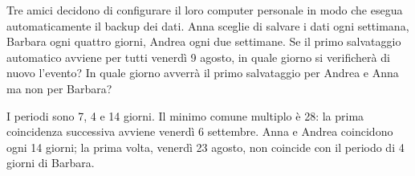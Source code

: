 
\begin{esercizio}
Tre amici decidono di configurare il loro computer personale in modo che esegua automaticamente il backup dei dati. Anna sceglie di salvare i dati ogni settimana, Barbara ogni quattro giorni, Andrea ogni due settimane. Se il primo salvataggio automatico avviene per tutti venerdì 9 agosto, in quale giorno si verificherà di nuovo l'evento? In quale giorno avverrà il primo salvataggio per Andrea e Anna ma non per Barbara?
\end{esercizio}

\begin{soluzione}
I periodi sono 7, 4 e 14 giorni. Il minimo comune multiplo è 28:
la prima coincidenza successiva avviene venerdì 6 settembre.
Anna e Andrea coincidono ogni 14 giorni; la prima volta, venerdì 23 agosto,
non coincide con il periodo di 4 giorni di Barbara.
\end{soluzione}
